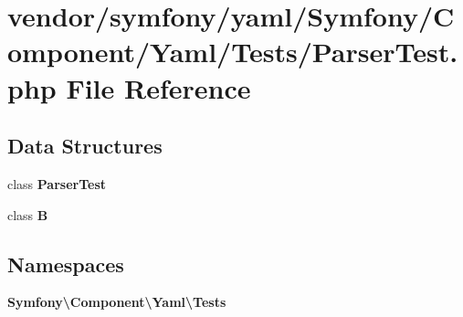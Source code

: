 \section{vendor/symfony/yaml/\+Symfony/\+Component/\+Yaml/\+Tests/\+Parser\+Test.php File Reference}
\label{symfony_2yaml_2_symfony_2_component_2_yaml_2_tests_2_parser_test_8php}
\subsection*{Data Structures}
\begin{DoxyCompactItemize}
\item 
class {\bf Parser\+Test}
\item 
class {\bf B}
\end{DoxyCompactItemize}
\subsection*{Namespaces}
\begin{DoxyCompactItemize}
\item 
 {\bf Symfony\textbackslash{}\+Component\textbackslash{}\+Yaml\textbackslash{}\+Tests}
\end{DoxyCompactItemize}
